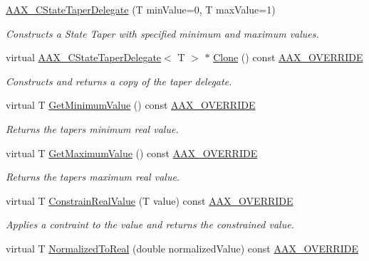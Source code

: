 \begin{DoxyCompactItemize}
\item 
\hyperlink{a00041_a99bdadedcd4de8f8f7a88536a6c262d2}{A\+A\+X\+\_\+\+C\+State\+Taper\+Delegate} (T min\+Value=0, T max\+Value=1)
\begin{DoxyCompactList}\small\item\em Constructs a State Taper with specified minimum and maximum values. \end{DoxyCompactList}\item 
virtual \hyperlink{a00041}{A\+A\+X\+\_\+\+C\+State\+Taper\+Delegate}$<$ T $>$ $\ast$ \hyperlink{a00041_a4a7f0c8d7a59a348d128a0bf750fea29}{Clone} () const \hyperlink{a00149_ac2f24a5172689ae684344abdcce55463}{A\+A\+X\+\_\+\+O\+V\+E\+R\+R\+I\+D\+E}
\begin{DoxyCompactList}\small\item\em Constructs and returns a copy of the taper delegate. \end{DoxyCompactList}\item 
virtual T \hyperlink{a00041_a28da4d5294316d4cacb8c12e5a21a598}{Get\+Minimum\+Value} () const \hyperlink{a00149_ac2f24a5172689ae684344abdcce55463}{A\+A\+X\+\_\+\+O\+V\+E\+R\+R\+I\+D\+E}
\begin{DoxyCompactList}\small\item\em Returns the taper\textquotesingle{}s minimum real value. \end{DoxyCompactList}\item 
virtual T \hyperlink{a00041_a0ef3b1e838f3e68da45663ea21cd54ed}{Get\+Maximum\+Value} () const \hyperlink{a00149_ac2f24a5172689ae684344abdcce55463}{A\+A\+X\+\_\+\+O\+V\+E\+R\+R\+I\+D\+E}
\begin{DoxyCompactList}\small\item\em Returns the taper\textquotesingle{}s maximum real value. \end{DoxyCompactList}\item 
virtual T \hyperlink{a00041_a6caec4112e24a711c9b7fdefa6384462}{Constrain\+Real\+Value} (T value) const \hyperlink{a00149_ac2f24a5172689ae684344abdcce55463}{A\+A\+X\+\_\+\+O\+V\+E\+R\+R\+I\+D\+E}
\begin{DoxyCompactList}\small\item\em Applies a contraint to the value and returns the constrained value. \end{DoxyCompactList}\item 
virtual T \hyperlink{a00041_a2a067bafa1822b1cf19816c64ce5e2d3}{Normalized\+To\+Real} (double normalized\+Value) const \hyperlink{a00149_ac2f24a5172689ae684344abdcce55463}{A\+A\+X\+\_\+\+O\+V\+E\+R\+R\+I\+D\+E}

\end{DoxyCompactItemize}
